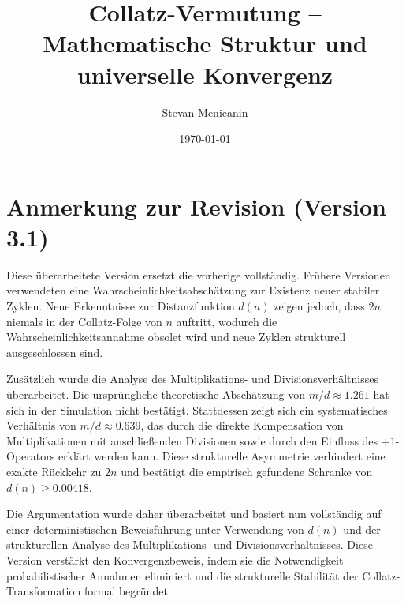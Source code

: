 \documentclass[a4paper,12pt]{article}
\title{Collatz-Vermutung – Mathematische Struktur und universelle Konvergenz}
\author{Stevan Menicanin}
\date{\today}
\begin{document}
\maketitle

\section*{Anmerkung zur Revision (Version 3.1)}
Diese überarbeitete Version ersetzt die vorherige vollständig. Frühere Versionen verwendeten eine Wahrscheinlichkeitsabschätzung zur Existenz neuer stabiler Zyklen. Neue Erkenntnisse zur Distanzfunktion $d(n)$ zeigen jedoch, dass $2n$ niemals in der Collatz-Folge von $n$ auftritt, wodurch die Wahrscheinlichkeitsannahme obsolet wird und neue Zyklen strukturell ausgeschlossen sind.

Zusätzlich wurde die Analyse des Multiplikations- und Divisionsverhältnisses überarbeitet. Die ursprüngliche theoretische Abschätzung von $m/d \approx 1.261$ hat sich in der Simulation nicht bestätigt. Stattdessen zeigt sich ein systematisches Verhältnis von $m/d \approx 0.639$, das durch die direkte Kompensation von Multiplikationen mit anschließenden Divisionen sowie durch den Einfluss des $+1$-Operators erklärt werden kann. Diese strukturelle Asymmetrie verhindert eine exakte Rückkehr zu $2n$ und bestätigt die empirisch gefundene Schranke von $d(n) \geq 0.00418$.

Die Argumentation wurde daher überarbeitet und basiert nun vollständig auf einer deterministischen Beweisführung unter Verwendung von $d(n)$ und der strukturellen Analyse des Multiplikations- und Divisionsverhältnisses. Diese Version verstärkt den Konvergenzbeweis, indem sie die Notwendigkeit probabilistischer Annahmen eliminiert und die strukturelle Stabilität der Collatz-Transformation formal begründet.
\end{document}
